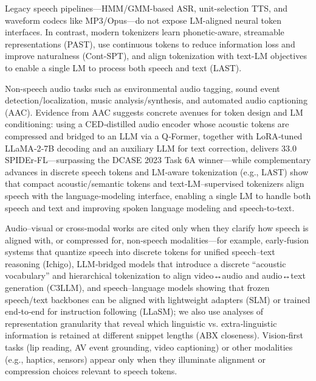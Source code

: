   \item Legacy speech pipelines—HMM/GMM-based ASR, unit-selection TTS, and waveform codecs like MP3/Opus—do not expose LM-aligned neural token interfaces. In contrast, modern tokenizers learn phonetic-aware, streamable representations (PAST), use continuous tokens to reduce information loss and improve naturalness (Cont-SPT), and align tokenization with text-LM objectives to enable a single LM to process both speech and text (LAST). \cite{li2025continuousspeechtokenizertext,har-tuv2025pastphoneticacousticspeechtokenizer,turetzky2024lastlanguagemodelawarespeechtokenization}

  \item Non-speech audio tasks such as environmental audio tagging, sound event detection/localization, music analysis/synthesis, and automated audio captioning (AAC). Evidence from AAC suggests concrete avenues for token design and LM conditioning: using a CED‑distilled audio encoder whose acoustic tokens are compressed and bridged to an LLM via a Q‑Former, together with LoRA‑tuned LLaMA‑2‑7B decoding and an auxiliary LLM for text correction, delivers 33.0 SPIDEr‑FL—surpassing the DCASE 2023 Task 6A winner—while complementary advances in discrete speech tokens and LM‑aware tokenization (e.g., LAST) show that compact acoustic/semantic tokens and text‑LM–supervised tokenizers align speech with the language‑modeling interface, enabling a single LM to handle both speech and text and improving spoken language modeling and speech‑to‑text. \cite{guo2025recentadvancesdiscretespeechtokensreview,liu2024enhancingautomatedaudiocaptioninglargela,turetzky2024lastlanguagemodelawarespeechtokenization}

  \item Audio–visual or cross‑modal works are cited only when they clarify how speech is aligned with, or compressed for, non‑speech modalities—for example, early‑fusion systems that quantize speech into discrete tokens for unified speech–text reasoning (Ichigo), LLM‑bridged models that introduce a discrete “acoustic vocabulary” and hierarchical tokenization to align video↔audio and audio↔text generation (C3LLM), and speech–language models showing that frozen speech/text backbones can be aligned with lightweight adapters (SLM) or trained end‑to‑end for instruction following (LLaSM); we also use analyses of representation granularity that reveal which linguistic vs. extra‑linguistic information is retained at different snippet lengths (ABX closeness). Vision‑first tasks (lip reading, AV event grounding, video captioning) or other modalities (e.g., haptics, sensors) appear only when they illuminate alignment or compression choices relevant to speech tokens. \cite{dao2025ichigomixedmodalearlyfusionrealtimevoice,fily2024establishingdegreesclosenessbetweenaudio,shu2023llasmlargelanguagespeechmodel,wang2023slmbridgethingapbetweenspeechtextfoundat,wang2024c3llmconditionalmultimodalcontentgenerat}

